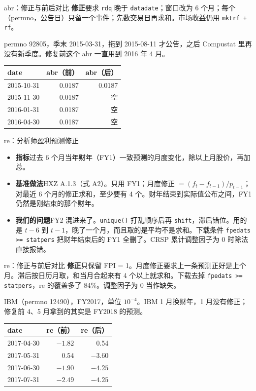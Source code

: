 \documentclass[UTF8,fontset=fandol,aspectratio=169,10pt,t]{ctexbeamer}
\newcommand{\chg}[1]{\textcolor{red!80!black}{#1}}
\newcommand{\kong}{空}
\newcommand{\code}[1]{\texttt{#1}}
\newcommand{\lab}[1]{\textbf{#1}\quad}
\newcommand{\tsize}{\small}
\newcommand{\src}[1]{{\footnotesize\color{black!60}#1}}
\begin{document}
\begin{frame}{abr：修正与前后对比}
\lab{修正}要求 \code{rdq} 晚于 \code{datadate}；窗口改为 6 个月；每个（permno，公告日）只留一个事件；先数交易日再求和。市场收益仍用 \code{mktrf + rf}。\par\medskip
\src{permno 92805，季末 2015-03-31，拖到 2015-08-11 才公告，之后 Compustat 里再没有新季度。修复前这个 abr 一直用到 2016 年 4 月。}\par\smallskip
{\tsize
\begin{tabular}{l rr}
\toprule
date & abr（前） & abr（后） \\
\midrule
2015-10-31 & 0.0187 & 0.0187 \\
2015-11-30 & 0.0187 & \chg{\kong} \\
2016-01-31 & 0.0187 & \chg{\kong} \\
2016-04-30 & 0.0187 & \chg{\kong} \\
\bottomrule
\end{tabular}}
\end{frame}

\begin{frame}{re：分析师盈利预测修正}
\begin{itemize}
\item \lab{指标}过去 6 个月当年财年（FY1）一致预测的月度变化，除以上月股价，再加总。
\item \lab{基准做法}HXZ A.1.3（式 A2）。只用 FY1；月度修正 $=(f_t-f_{t-1})/p_{t-1}$；对最近 6 个月的修正求和，至少要有 4 个。财年结束到实际值公布之间，FY1 仍然是刚结束的那个财年。
\item \lab{我们的问题}FY2 混进来了。\code{unique()} 打乱顺序后再 \code{shift}，滞后错位。用的是 $t-6$ 到 $t-1$，晚了一个月，而且取的是平均不是求和。下载条件 \code{fpedats >= statpers} 把财年结束后的 FY1 全删了。CRSP 累计调整因子为 0 时除法直接报错。
\end{itemize}
\end{frame}

\begin{frame}{re：修正与前后对比}
\lab{修正}只保留 FPI = 1。月度修正要求上一条预测正好是上个月。滞后按日历月取，和当月合起来有 4 个以上就求和。下载去掉 \code{fpedats >= statpers}，re 的覆盖多了 84\%。调整因子为 0 当作缺失。\par\medskip
\src{IBM（permno 12490），FY2017，单位 $10^{-4}$。IBM 1 月换财年，1 月没有修正；修复前 4、5 月拿到的其实是 FY2018 的预测。}\par\smallskip
{\tsize
\begin{tabular}{l rr}
\toprule
date & re（前） & re（后） \\
\midrule
2017-04-30 & $-1.82$ & \chg{0.54} \\
2017-05-31 & $0.54$ & \chg{$-3.60$} \\
2017-06-30 & $-1.90$ & \chg{$-4.25$} \\
2017-07-31 & $-2.49$ & \chg{$-4.25$} \\
\bottomrule
\end{tabular}}
\end{frame}
\end{document}
